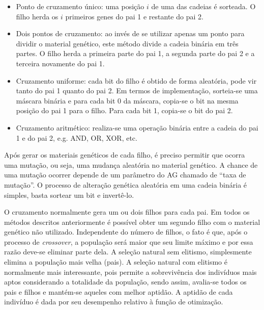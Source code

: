 \begin{itemize}  
	\item Ponto de cruzamento único: uma posição $i$ de uma das cadeias é sorteada. O filho herda os $i$ primeiros genes do pai 1 e restante do pai 2.
	\item Dois pontos de cruzamento: ao invés de se utilizar apenas um ponto para dividir o material genético, este método divide a cadeia binária em três partes. O filho herda a primeira parte do pai 1, a segunda parte do pai 2 e a terceira novamente do pai 1.
	\item Cruzamento uniforme: cada bit do filho é obtido de forma aleatória, pode vir tanto do pai 1 quanto do pai 2. Em termos de implementação, sorteia-se uma máscara binária e para cada bit 0 da máscara, copia-se o bit na mesma posição do pai 1 para o filho. Para cada bit 1, copia-se o bit do pai 2.
	\item Cruzamento aritmético: realiza-se uma operação binária entre a cadeia do pai 1 e do pai 2, e.g. AND, OR, XOR, etc.
\end{itemize}

Após gerar os materiais genéticos de cada filho, é preciso permitir que ocorra uma mutação, ou seja, uma mudança aleatória no material genético. A chance de uma mutação ocorrer depende de um parâmetro do AG chamado de ``taxa de mutação''. O processo de alteração genética aleatória em uma cadeia binária é simples, basta sortear um bit e invertê-lo.

O cruzamento normalmente gera um ou dois filhos para cada pai. Em todos os métodos descritos anteriormente é possível obter um segundo filho com o material genético não utilizado. Independente do número de filhos, o fato é que, após o processo de \textit{crossover}, a população será maior que seu limite máximo e por essa razão deve-se eliminar parte dela. A seleção natural sem elitismo, simplesmente elimina a população mais velha (pais). A seleção natural com elitismo é normalmente mais interessante, pois permite a sobrevivência dos indivíduos mais aptos considerando a totalidade da população, sendo assim, avalia-se todos os pais e filhos e mantém-se aqueles com melhor aptidão. A aptidão de cada indivíduo é dada por seu desempenho relativo à função de otimização.

